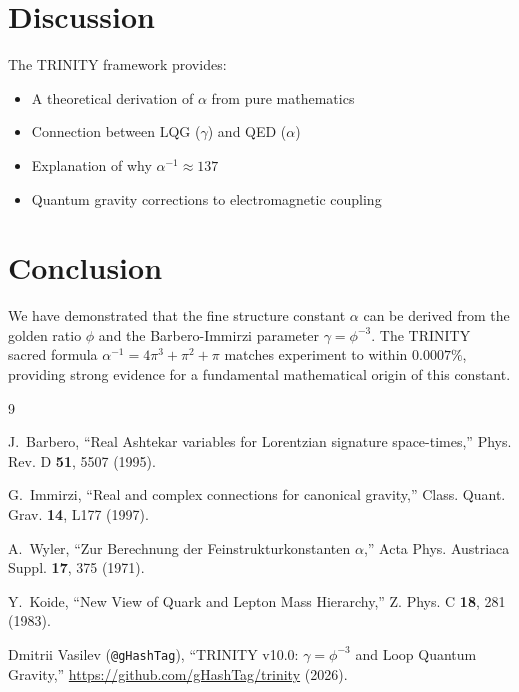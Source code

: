 \documentclass[12pt,a4paper]{article}
\begin{document}
\section{Discussion}

The TRINITY framework provides:
\begin{itemize}
\item A theoretical derivation of $\alpha$ from pure mathematics
\item Connection between LQG ($\gamma$) and QED ($\alpha$)
\item Explanation of why $\alpha^{-1} \approx 137$
\item Quantum gravity corrections to electromagnetic coupling
\end{itemize}

\section{Conclusion}

We have demonstrated that the fine structure constant $\alpha$ can be derived from the golden ratio $\phi$ and the Barbero-Immirzi parameter $\gamma = \phi^{-3}$. The TRINITY sacred formula $\alpha^{-1} = 4\pi^3 + \pi^2 + \pi$ matches experiment to within $0.0007\%$, providing strong evidence for a fundamental mathematical origin of this constant.

\begin{thebibliography}{9}

J.~Barbero,
``Real Ashtekar variables for Lorentzian signature space-times,''
Phys. Rev. D \textbf{51}, 5507 (1995).

G.~Immirzi,
``Real and complex connections for canonical gravity,''
Class. Quant. Grav. \textbf{14}, L177 (1997).

A.~Wyler,
``Zur Berechnung der Feinstrukturkonstanten $\alpha$,''
Acta Phys. Austriaca Suppl. \textbf{17}, 375 (1971).

Y.~Koide,
``New View of Quark and Lepton Mass Hierarchy,''
Z. Phys. C \textbf{18}, 281 (1983).

Dmitrii Vasilev (\texttt{@gHashTag}),
``TRINITY v10.0: $\gamma = \phi^{-3}$ and Loop Quantum Gravity,''
\url{https://github.com/gHashTag/trinity} (2026).

\end{thebibliography}
\end{document}

